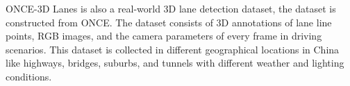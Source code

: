 ONCE-3D Lanes \cite{yan2022once} is also a real-world 3D lane detection dataset, the dataset is constructed from ONCE\cite{mao2021one}. The dataset consists of 3D annotations of lane line points, RGB images, and the camera parameters of every frame in driving scenarios. This dataset is collected in different geographical locations in China like highways, bridges, suburbs, and tunnels with different weather and lighting conditions.



